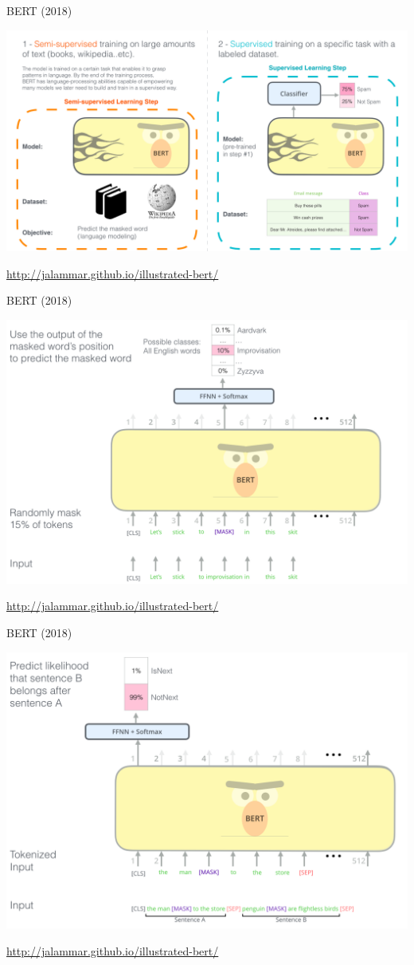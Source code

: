 \documentclass[notes,12pt, aspectratio=169]{beamer}
\begin{document}
\begin{frame}{BERT (2018)}
\begin{center}
	\includegraphics[width=0.8\linewidth]{BERT_stud}
\end{center}
\vfill
\footnotesize
{\color{blue} \url{http://jalammar.github.io/illustrated-bert/}}
\end{frame}


\begin{frame}{BERT (2018)}
\begin{center}
	\includegraphics[width=0.7\linewidth]{pre_train_bert}
\end{center}
\vfill
\footnotesize
{\color{blue} \url{http://jalammar.github.io/illustrated-bert/}}
\end{frame}


\begin{frame}{BERT (2018)}
\begin{center}
	\includegraphics[width=0.65\linewidth]{bert_sent}
\end{center}
\vfill
\footnotesize
{\color{blue} \url{http://jalammar.github.io/illustrated-bert/}}
\end{frame}
\end{document}
